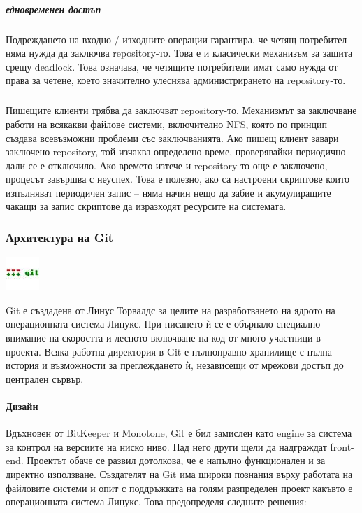 \documentclass[a4paper]{article}
\begin{document}
      \subparagraph{едновременен достъп}
      Подреждането на входно / изходните операции гарантира, че четящ
      потребител няма нужда да заключва repository-то. Това е и класически
      механизъм за защита срещу deadlock. Това означава, че четящите
      потребители имат само нужда от права за четене, което значително улеснява
      администрирането на repository-то.

      \subparagraph{}
      Пишещите клиенти трябва да заключват repository-то. Механизмът за
      заключване работи на всякакви файлове системи, включително NFS\cite{nfs},
      която по принцип създава всевъзможни проблеми със заключванията. Ако пишещ клиент
      завари заключено repository, той изчаква определено време, проверявайки
      периодично дали се е отключило. Ако времето изтече и repository-то още
      е заключено, процесът завършва с неуспех. Това е полезно, ако са настроени
      скриптове които изпълняват периодичен запис -- няма начин нещо да забие
      и акумулиращите чакащи за запис скриптове да изразходят ресурсите на
      системата.

    \subsubsection{Архитектура на Git}
    \includegraphics[scale=1.0]{git_icon}


    Git е създадена от Линус Торвалдс за целите на разработването на ядрото на операционната система Линукс. При писането ѝ се е обърнало специално внимание на скоростта и лесното включване на код от много участници в проекта. Всяка работна директория в Git е пълноправно хранилище с пълна история и възможности за преглеждането ѝ, независещи от мрежови достъп до централен сървър.
  
    \paragraph{Дизайн}

    Вдъхновен от BitKeeper и Monotone, Git е бил замислен като engine за система за контрол на версиите на ниско ниво. Над него други щели да надграждат front-end. Проектът обаче се развил дотолкова, че е напълно функционален и за директно използване. Създателят на Git има широки познания върху работата на файловите системи и опит с поддръжката на голям разпределен проект какъвто е операционната система Линукс. Това предопределя следните решения:
\end{document}
